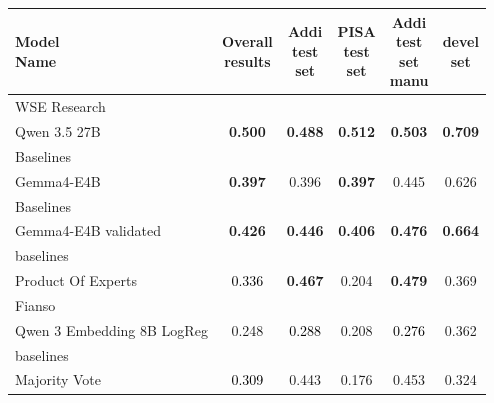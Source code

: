 \begin{tabularx}{\textwidth}{X | c c c c c}
\hline
\makecell[b]{\textbf{Model} \\ \textbf{Name}} & \makecell[b]{\textbf{Overall} \\ \textbf{results}} & \makecell[b]{\textbf{Addi} \\ \textbf{test} \\ \textbf{set}} & \makecell[b]{\textbf{PISA} \\ \textbf{test} \\ \textbf{set}} & \makecell[b]{\textbf{Addi} \\ \textbf{test} \\ \textbf{set} \\ \textbf{manu}} & \makecell[b]{\textbf{devel} \\ \textbf{set}} \\
\hline
WSE Research\\\subcatarrow{}Qwen 3.5 27B & \textbf{\textcolor{BrickRed}{0.500}} & \textbf{\textcolor{BrickRed}{0.488}} & \textbf{\textcolor{BrickRed}{0.512}} & \textbf{\textcolor{BrickRed}{0.503}} & \textbf{\textcolor{White!50!BrickRed}{0.709}} \\
Baselines\\\subcatarrow{}Gemma4-E4B & \textbf{\textcolor{White!50!BrickRed}{0.397}} & \textcolor{White!50!BrickRed}{0.396} & \textbf{\textcolor{White!50!BrickRed}{0.397}} & \textcolor{White!50!BrickRed}{0.445} & \textcolor{White!50!BrickRed}{0.626} \\
Baselines\\\subcatarrow{}Gemma4-E4B validated & \textbf{\textcolor{White!50!BrickRed}{0.426}} & \textbf{\textcolor{BrickRed}{0.446}} & \textbf{\textcolor{White!50!BrickRed}{0.406}} & \textbf{\textcolor{BrickRed}{0.476}} & \textbf{\textcolor{White!50!BrickRed}{0.664}} \\
baselines\\\subcatarrow{}Product Of Experts & \textcolor{Black}{0.336} & \textbf{\textcolor{BrickRed}{0.467}} & \textcolor{White!50!NavyBlue}{0.204} & \textbf{\textcolor{BrickRed}{0.479}} & \textcolor{White!50!NavyBlue}{0.369} \\
Fianso\\\subcatarrow{}Qwen 3 Embedding 8B LogReg & \textcolor{White!50!NavyBlue}{0.248} & \textcolor{Black}{0.288} & \textcolor{White!50!NavyBlue}{0.208} & \textcolor{Black}{0.276} & \textcolor{White!50!NavyBlue}{0.362} \\
baselines\\\subcatarrow{}Majority Vote & \textcolor{Black}{0.309} & \textcolor{BrickRed}{0.443} & \textcolor{White!50!NavyBlue}{0.176} & \textcolor{BrickRed}{0.453} & \textcolor{White!50!NavyBlue}{0.324} \\

\end{tabularx}
